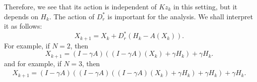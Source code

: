 Therefore, we see that its action is independent of $Kz_k$ in this setting, but it depends on $H_k$. The action of $D_r^*$ is important for the analysis. We shall interpret it as follows: 
\begin{equation} 
X_{k+1} = X_k + D_r^*(H_k - A(X_k)).  
\end{equation} 
For example, if $N = 2$, then 
\begin{equation} 
X_{k+1} = (I - \gamma A)((I - \gamma A)(X_k) + \gamma H_k) + \gamma H_k. 
\end{equation}
and for example, if $N = 3$, then 
\begin{eqnarray*} 
X_{k+1} = (I - \gamma A)((I - \gamma A)((I - \gamma A)(X_k) + \gamma H_k) + \gamma H_k) + \gamma H_k.  
\end{eqnarray*}


